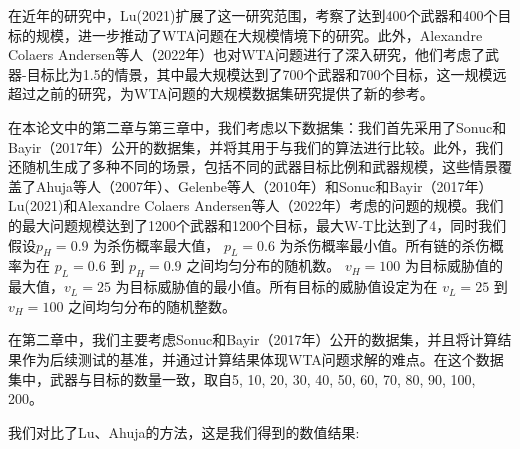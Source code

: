 在近年的研究中，Lu(2021)扩展了这一研究范围，考察了达到400个武器和400个目标的规模，进一步推动了WTA问题在大规模情境下的研究。此外，Alexandre Colaers Andersen等人（2022年）也对WTA问题进行了深入研究，他们考虑了武器-目标比为1.5的情景，其中最大规模达到了700个武器和700个目标，这一规模远超过之前的研究，为WTA问题的大规模数据集研究提供了新的参考。

在本论文中的第二章与第三章中，我们考虑以下数据集：我们首先采用了Sonuc和Bayir（2017年）公开的数据集，并将其用于与我们的算法进行比较。此外，我们还随机生成了多种不同的场景，包括不同的武器目标比例和武器规模，这些情景覆盖了Ahuja等人（2007年）、Gelenbe等人（2010年）和Sonuc和Bayir（2017年）Lu(2021)和Alexandre Colaers Andersen等人（2022年）考虑的问题的规模。我们的最大问题规模达到了1200个武器和1200个目标，最大W-T比达到了4，同时我们假设$p_H = 0.9$ 为杀伤概率最大值， $p_L = 0.6$ 为杀伤概率最小值。所有链的杀伤概率为在 $p_L = 0.6$ 到 $p_H = 0.9$ 之间均匀分布的随机数。
$v_H = 100$ 为目标威胁值的最大值，$v_L = 25$ 为目标威胁值的最小值。所有目标的威胁值设定为在 $v_L = 25$ 到 $v_H = 100$ 之间均匀分布的随机整数。

在第二章中，我们主要考虑Sonuc和Bayir（2017年）公开的数据集，并且将计算结果作为后续测试的基准，并通过计算结果体现WTA问题求解的难点。在这个数据集中，武器与目标的数量一致，取自{5, 10, 20, 30, 40, 50, 60, 70, 80, 90, 100, 200}。

我们对比了Lu、Ahuja的方法，这是我们得到的数值结果:

